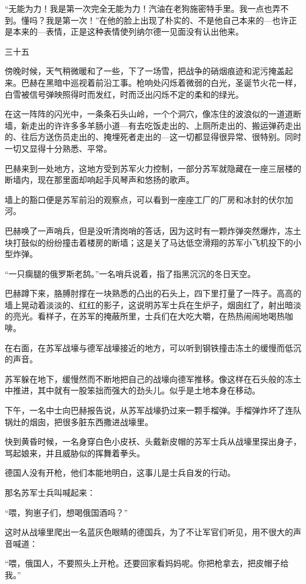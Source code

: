 “无能为力！我是第一次完全无能为力！汽油在老狗施密特手里。我一点也弄不到。懂吗？我是第一次！”在他的脸上出现了朴实的、不是他自己本来的—也许正是本来的—表情，正是这种表情使列纳尔德一见面没有认出他来。

三十五

傍晚时候，天气稍微暖和了一些，下了一场雪，把战争的硝烟痕迹和泥污掩盖起来。巴赫在黑暗中巡视着前沿工事。枪响处闪烁着微弱的白光，圣诞节火花一样，白雪被信号弹映照得时而发红，时而泛出闪烁不定的柔和的绿光。

在这一阵阵的闪光中，一条条石头山岭，一个个洞穴，像冻住的波浪似的一道道断墙，新走出的许许多多羊肠小道—有去吃饭走出的、上厕所走出的、搬运弹药走出的、往后方送伤员走出的、掩埋死者走出的—这一切都显得很异常、很特别。同时一切又显得十分熟悉、平常。

巴赫来到一处地方，这地方受到苏军火力控制，一部分苏军就隐藏在一座三层楼的断墙内，现在那里面却响起手风琴声和悠扬的歌声。

墙上的豁口便是苏军前沿的观察点，可以看到一座座工厂的厂房和冰封的伏尔加河。

巴赫唤了一声哨兵，但是没听清岗哨的答话，因为这时有一颗炸弹突然爆炸，冻土块打鼓似的纷纷撞击着楼房的断墙；这是关了马达低空滑翔的苏军小飞机投下的小型炸弹。

“一只瘸腿的俄罗斯老鸹。”一名哨兵说着，指了指黑沉沉的冬日天空。

巴赫蹲下来，胳膊肘撑在一块熟悉的凸出的石头上，四下里打量了一阵子。高高的墙上晃动着淡淡的、红红的影子，这说明苏军士兵在生炉子，烟囱红了，射出暗淡的亮光。看样子，在苏军的掩蔽所里，士兵们在大吃大嚼，在热热闹闹地喝热咖啡。

在右面，在苏军战壕与德军战壕接近的地方，可以听到钢铁撞击冻土的缓慢而低沉的声音。

苏军躲在地下，缓慢然而不断地把自己的战壕向德军推移。像这样在石头般的冻土中推进，其中就有一股笨拙而强大的劲头儿。似乎是土地本身在移动。

下午，一名中士向巴赫报告说，从苏军战壕扔过来一颗手榴弹。手榴弹炸坏了连队锅灶的烟囱，把很多脏东西撒进战壕里。

快到黄昏时候，一名身穿白色小皮袄、头戴新皮帽的苏军士兵从战壕里探出身子，骂起娘来，并且威胁似的挥舞着拳头。

德国人没有开枪，他们本能地明白，这事儿是士兵自发的行动。

那名苏军士兵叫喊起来：

“喂，狗崽子们，想喝俄国酒吗？”

这时从战壕里爬出一名蓝灰色眼睛的德国兵，为了不让军官们听见，用不很大的声音喊道：

“喂，俄国人，不要照头上开枪。还要回家看妈妈呢。你把枪拿去，把皮帽子给我。”

